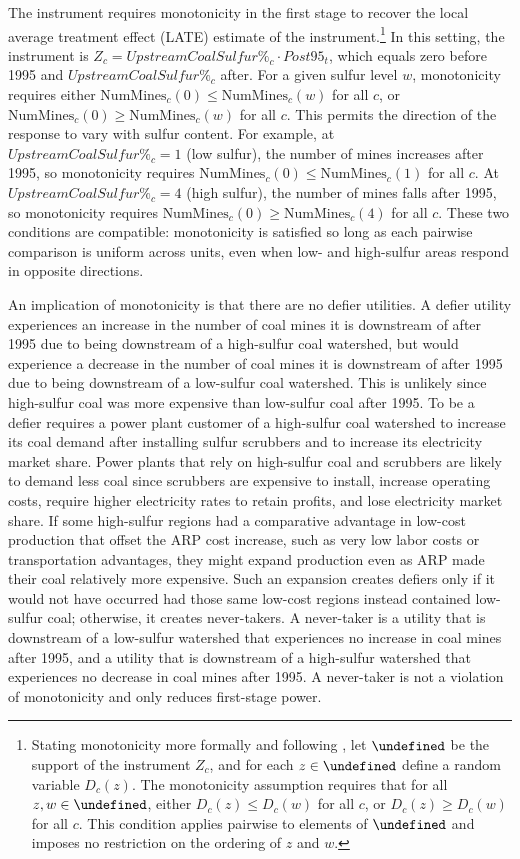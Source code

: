 \documentclass[12pt]{article}
\let\Psi\undefined
\begin{document}
The instrument requires monotonicity in the first stage to recover the local average treatment effect (LATE) estimate of the instrument.\footnote{Stating monotonicity more formally and following \textcite{angrist1994identification}, let $\Psi$ be the support of the instrument $Z_c$, and for each $z \in \Psi$ define a random variable $D_c(z)$. The monotonicity assumption requires that for all $z, w \in \Psi$, either $D_c(z) \leq D_c(w)$ for all $c$, or $D_c(z) \geq D_c(w)$ for all $c$. This condition applies pairwise to elements of $\Psi$ and imposes no restriction on the ordering of $z$ and $w$.} In this setting, the instrument is $Z_c = UpstreamCoalSulfur\%_c \cdot Post95_t$, which equals zero before 1995 and $UpstreamCoalSulfur\%_c$ after. For a given sulfur level $w$, monotonicity requires either $\text{NumMines}_c(0) \leq \text{NumMines}_c(w)$ for all $c$, or $\text{NumMines}_c(0) \geq \text{NumMines}_c(w)$ for all $c$. This permits the direction of the response to vary with sulfur content. For example, at $UpstreamCoalSulfur\%_c = 1$ (low sulfur), the number of mines increases after 1995, so monotonicity requires $\text{NumMines}_c(0) \leq \text{NumMines}_c(1)$ for all $c$. At $UpstreamCoalSulfur\%_c = 4$ (high sulfur), the number of mines falls after 1995, so monotonicity requires $\text{NumMines}_c(0) \geq \text{NumMines}_c(4)$ for all $c$. These two conditions are compatible: monotonicity is satisfied so long as each pairwise comparison is uniform across units, even when low- and high-sulfur areas respond in opposite directions.

An implication of monotonicity is that there are no defier utilities. A defier utility experiences an increase in the number of coal mines it is downstream of after 1995 due to being downstream of a high-sulfur coal watershed, but would experience a decrease in the number of coal mines it is downstream of after 1995 due to being downstream of a low-sulfur coal watershed. This is unlikely since high-sulfur coal was more expensive than low-sulfur coal after 1995. To be a defier requires a power plant customer of a high-sulfur coal watershed to increase its coal demand after installing sulfur scrubbers and to increase its electricity market share. Power plants that rely on high-sulfur coal and scrubbers are likely to demand less coal since scrubbers are expensive to install, increase operating costs, require higher electricity rates to retain profits, and lose electricity market share. If some high-sulfur regions had a comparative advantage in low-cost production that offset the ARP cost increase, such as very low labor costs or transportation advantages, they might expand production even as ARP made their coal relatively more expensive. Such an expansion creates defiers only if it would not have occurred had those same low-cost regions instead contained low-sulfur coal; otherwise, it creates never-takers. A never-taker is a utility that is downstream of a low-sulfur watershed that experiences no increase in coal mines after 1995, and a utility that is downstream of a high-sulfur watershed that experiences no decrease in coal mines after 1995. A never-taker is not a violation of monotonicity and only reduces first-stage power. 
\end{document}

